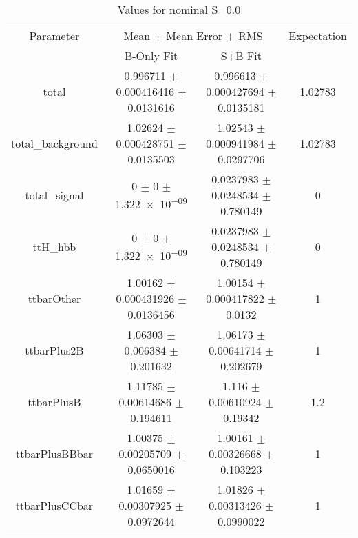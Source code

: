 \begin{table}
\centering
\caption{Values for nominal S=0.0}
\begin{tabular}{cccc}
\toprule
Parameter & \multicolumn{2}{c}{Mean $\pm$ Mean Error $\pm$ RMS} & Expectation\\
 & B-Only Fit & S+B Fit & \\
\midrule
total & \num{0.996711} $\pm$ \num{0.000416416} $\pm$ \num{0.0131616} & \num{0.996613} $\pm$ \num{0.000427694} $\pm$ \num{0.0135181} & \num{1.02783}\\
total\_background & \num{1.02624} $\pm$ \num{0.000428751} $\pm$ \num{0.0135503} & \num{1.02543} $\pm$ \num{0.000941984} $\pm$ \num{0.0297706} & \num{1.02783}\\
total\_signal & \num{0} $\pm$ \num{0} $\pm$ \num{1.322e-09} & \num{0.0237983} $\pm$ \num{0.0248534} $\pm$ \num{0.780149} & \num{0}\\
ttH\_hbb & \num{0} $\pm$ \num{0} $\pm$ \num{1.322e-09} & \num{0.0237983} $\pm$ \num{0.0248534} $\pm$ \num{0.780149} & \num{0}\\
ttbarOther & \num{1.00162} $\pm$ \num{0.000431926} $\pm$ \num{0.0136456} & \num{1.00154} $\pm$ \num{0.000417822} $\pm$ \num{0.0132} & \num{1}\\
ttbarPlus2B & \num{1.06303} $\pm$ \num{0.006384} $\pm$ \num{0.201632} & \num{1.06173} $\pm$ \num{0.00641714} $\pm$ \num{0.202679} & \num{1}\\
ttbarPlusB & \num{1.11785} $\pm$ \num{0.00614686} $\pm$ \num{0.194611} & \num{1.116} $\pm$ \num{0.00610924} $\pm$ \num{0.19342} & \num{1.2}\\
ttbarPlusBBbar & \num{1.00375} $\pm$ \num{0.00205709} $\pm$ \num{0.0650016} & \num{1.00161} $\pm$ \num{0.00326668} $\pm$ \num{0.103223} & \num{1}\\
ttbarPlusCCbar & \num{1.01659} $\pm$ \num{0.00307925} $\pm$ \num{0.0972644} & \num{1.01826} $\pm$ \num{0.00313426} $\pm$ \num{0.0990022} & \num{1}\\
\bottomrule
\end{tabular}
\end{table}